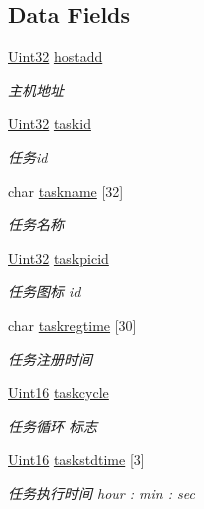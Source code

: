 \subsection*{Data Fields}
\begin{DoxyCompactItemize}
\item 
\hyperlink{base_8h_a60cf7b3c038ce37a50796e8eaddf0b5f}{Uint32} \hyperlink{structTaskInfo_a633cb279d0c214d3eba9da3d26f5a020}{hostadd}
\begin{DoxyCompactList}\small\item\em 主机地址 \end{DoxyCompactList}\item 
\hyperlink{base_8h_a60cf7b3c038ce37a50796e8eaddf0b5f}{Uint32} \hyperlink{structTaskInfo_a27224eae1effa0e80bc2fa52dde59692}{taskid}
\begin{DoxyCompactList}\small\item\em 任务id \end{DoxyCompactList}\item 
char \hyperlink{structTaskInfo_a93bbd541a14b0eb3be4d81df457f53c0}{taskname} \mbox{[}32\mbox{]}
\begin{DoxyCompactList}\small\item\em 任务名称 \end{DoxyCompactList}\item 
\hyperlink{base_8h_a60cf7b3c038ce37a50796e8eaddf0b5f}{Uint32} \hyperlink{structTaskInfo_ab853cd6598db69ad460ab8ae9efa49b6}{taskpicid}
\begin{DoxyCompactList}\small\item\em 任务图标 id \end{DoxyCompactList}\item 
char \hyperlink{structTaskInfo_af4123b5a228c33d071e00474447e3a7b}{taskregtime} \mbox{[}30\mbox{]}
\begin{DoxyCompactList}\small\item\em 任务注册时间 \end{DoxyCompactList}\item 
\hyperlink{base_8h_ae9f2e1f80fbd243687a04febbf590e13}{Uint16} \hyperlink{structTaskInfo_a585a387b5d639defa31bb8511d0c3b48}{taskcycle}
\begin{DoxyCompactList}\small\item\em 任务循环 标志 \end{DoxyCompactList}\item 
\hyperlink{base_8h_ae9f2e1f80fbd243687a04febbf590e13}{Uint16} \hyperlink{structTaskInfo_a82ca17b1ed9c9059cf624032fd25a15d}{taskstdtime} \mbox{[}3\mbox{]}
\begin{DoxyCompactList}\small\item\em 任务执行时间 hour \-: min \-: sec \end{DoxyCompactList}\item 

\end{DoxyCompactItemize}
